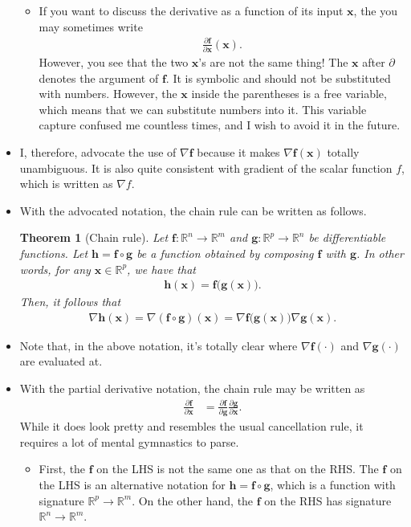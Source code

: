 \documentclass[10pt]{article}
\newtheorem{theorem}[lemma]{Theorem}
\newcommand{\ve}[1]{\mathbf{#1}}
\newcommand{\Real}{\mathbb{R}}
\begin{document}
\begin{itemize}
\begin{itemize}
    \item If you want to discuss the derivative as a function of its input $\ve{x}$, the you may sometimes write
    \begin{align*}
      \frac{\partial \ve{f}}{\partial \ve{x}}(\ve{x}).
    \end{align*}
    However, you see that the two $\ve{x}$'s are not the same thing! The $\ve{x}$ after $\partial$ denotes the argument of $\ve{f}$. It is symbolic and should not be substituted with numbers. However, the $\ve{x}$ inside the parentheses is a free variable, which means that we can substitute numbers into it. This variable capture confused me countless times, and I wish to avoid it in the future.
  \end{itemize}
  
  \item I, therefore, advocate the use of $\nabla \ve{f}$ because it makes $\nabla \ve{f}(\ve{x})$ totally unambiguous. It is also quite consistent with gradient of the scalar function $f$, which is written as $\nabla f$.
  
  \item With the advocated notation, the chain rule can be written as follows.
  
  \begin{theorem}[Chain rule]
    Let $\ve{f}: \Real^n \rightarrow \Real^m$ and $\ve{g}: \Real^p \rightarrow \Real^n$ be differentiable functions. Let $\ve{h} = \ve{f} \circ \ve{g}$ be a function obtained by composing $\ve{f}$ with $\ve{g}$. In other words, for any $\ve{x} \in \Real^p$, we have that
    \begin{align*}
      \ve{h}(\ve{x}) = \ve{f}\big(\ve{g}(\ve{x})\big).
    \end{align*}
    Then, it follows that
    \begin{align*}
      \nabla \ve{h}(\ve{x}) = \nabla(\ve{f}\circ \ve{g})(\ve{x}) = \nabla \ve{f}\big( \ve{g}(\ve{x}) \big) \nabla \ve{g}(\ve{x}).
    \end{align*}
  \end{theorem}

  \item Note that, in the above notation, it's totally clear where $\nabla \ve{f}(\cdot)$ and $\nabla\ve{g}(\cdot)$ are evaluated at. 
  
  \item With the partial derivative notation, the chain rule may be written as
  \begin{align*}
    \frac{\partial \ve{f}}{\partial \ve{x}}
    &= \frac{\partial \ve{f}}{\partial \ve{g}} \frac{\partial \ve{g}}{\partial \ve{x}}.
  \end{align*}
  While it does look pretty and resembles the usual cancellation rule, it requires a lot of mental gymnastics to parse.
  \begin{itemize}
    \item First, the $\ve{f}$ on the LHS is not the same one as that on the RHS. The $\ve{f}$ on the LHS is an alternative notation for $\ve{h} = \ve{f} \circ \ve{g}$, which is a function with signature $\Real^p \rightarrow \Real^m$. On the other hand, the $\ve{f}$ on the RHS has signature $\Real^n \rightarrow \Real^m$.
    

\end{itemize}
\end{itemize}
\end{document}
